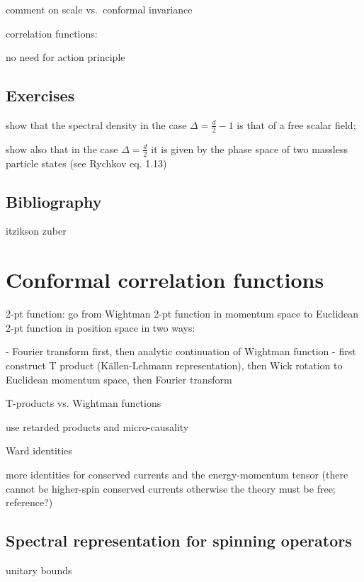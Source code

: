 \documentclass[a4paper,12pt]{article}
\numberwithin{equation}{section}
\begin{document}
comment on scale vs.~conformal invariance

correlation functions:

no need for action principle



\subsection{Exercises}

show that the spectral density in the case $\Delta = \frac{d}{2} - 1$ is that of a free scalar field;

show also that in the case $\Delta = \frac{d}{2}$ it is given by the phase space of two massless particle states (see Rychkov eq. 1.13)


\subsection{Bibliography}

itzikson zuber


\section{Conformal correlation functions}


2-pt function: go from Wightman 2-pt function in momentum space to Euclidean 2-pt function in position space in two ways:

- Fourier transform first, then analytic continuation of Wightman function
- first construct T product (Källen-Lehmann representation), then Wick rotation to Euclidean momentum space, then Fourier transform



T-products vs. Wightman functions

use retarded products and micro-causality


Ward identities

more identities for conserved currents and the energy-momentum tensor
(there cannot be higher-spin conserved currents otherwise the theory must be free; reference?)


\subsection{Spectral representation for spinning operators}

unitary bounds
\end{document}

